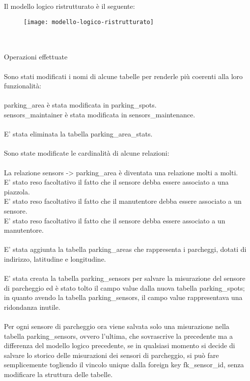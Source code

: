 Il modello logico ristrutturato è il seguente:
\begin{figure}[!h]
  \centering
  \texttt{[image: modello-logico-ristrutturato]}
\end{figure}
\\\\
Operazioni effettuate
\\\\
Sono stati modificati i nomi di alcune tabelle per renderle più coerenti alla loro funzionalità:
\\\\
parking\_area è stata modificata in parking\_spots.
\\
sensors\_maintainer è stata modificata in sensors\_maintenance.
\\\\
E' stata eliminata la tabella parking\_area\_stats.
\\\\
Sono state modificate le cardinalità di alcune relazioni:
\\\\
La relazione sensors -> parking\_area è diventata una relazione molti a molti.
\\
E' stato reso facoltativo il fatto che il sensore debba essere associato a una piazzola.
\\
E' stato reso facoltativo il fatto che il manutentore debba essere associato a un sensore.
\\
E' stato reso facoltativo il fatto che il sensore debba essere associato a un manutentore.
\\\\
E' stata aggiunta la tabella parking\_areas che rappresenta i parcheggi, dotati di indirizzo, latitudine e 
longitudine.
\\\\
E' stata creata la tabella parking\_sensors per salvare la misurazione del sensore di parcheggio ed è
stato tolto il campo value dalla nuova tabella parking\_spots; in quanto avendo la tabella parking\_sensors,
il campo value rappresentava una ridondanza inutile.
\\\\
Per ogni sensore di parcheggio ora viene salvata solo una misurazione nella tabella parking\_sensors, ovvero
l'ultima, che sovrascrive la precedente ma a differenza del modello logico precedente, se in qualsiasi momento
si decide di salvare lo storico delle misurazioni dei sensori di parcheggio, si può fare semplicemente togliendo
il vincolo unique dalla foreign key fk\_sensor\_id, senza modificare la struttura delle tabelle.